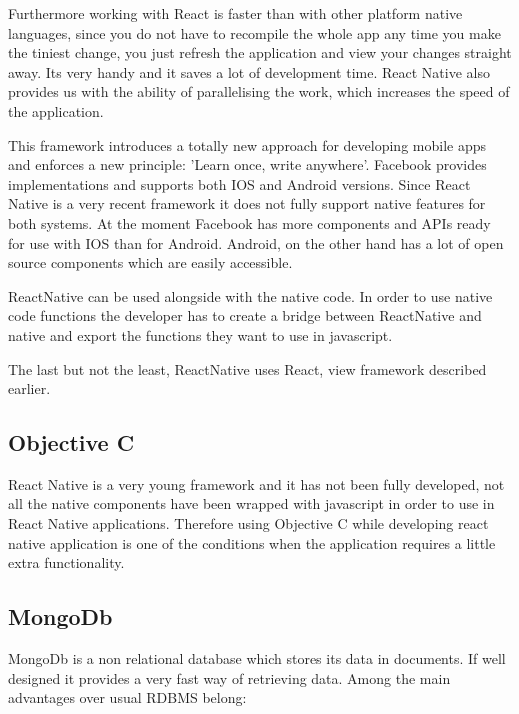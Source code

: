 \documentclass[thesis=M,english]{FITthesis}[2012/10/20]
\begin{document}
Furthermore working with React is faster than with other platform native languages, since you do not have to recompile the whole app any time you make the tiniest change, you just refresh the application and view your changes straight away. Its very handy and it saves a lot of development time. React Native also provides us with the ability of parallelising the work, which increases the speed of the application.

This framework introduces a totally new approach for developing mobile apps and enforces a new principle: 'Learn once, write anywhere'. Facebook provides implementations and supports both IOS and Android versions. Since React Native is a very recent framework it does not fully support native features for both systems. At the moment Facebook has more components and APIs ready for use with IOS than for Android. Android, on the other hand has a lot of open source components which are easily accessible.

ReactNative can be used alongside with the native code. In order to use native code functions the developer has to create a bridge between ReactNative and native and export the functions they want to use in javascript.

The last but not the least, ReactNative uses React, view framework described earlier. \cite{react-fb-native}


\subsection{Objective C}

React Native is a very young framework and it has not been fully developed, not all the native components have been wrapped with javascript in order to use in React Native applications. Therefore using Objective C while developing react native application is one of the conditions when the application requires a little extra functionality.

\subsection{MongoDb}
MongoDb is a non relational database which stores its data in documents. If well designed it provides a very fast way of retrieving data. Among the main advantages over usual RDBMS belong:
\end{document}
